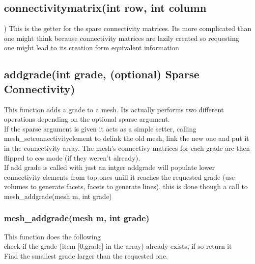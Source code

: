 \documentclass[]{article}
\begin{document}
\subsection{connectivitymatrix(int row, int column})
This is the getter for the spare connectivity matrices. Its more complicated than one might think because connectivity matrices are lazily created so requesting one might lead to its creation form equivalent information

\subsection{addgrade(int grade, (optional) Sparse Connectivity)}
This function adds a grade to a mesh. Its actually performs two different operations depending on the optional sparse argument.\\

If the sparse argument is given it acts as a simple setter, calling mesh\_setconnectivityelement to delink the old mesh, link the new one and put it in the connectivity array. The mesh's connectivy matrices for each grade are then flipped to ccs mode (if they weren't already).\\

If add grade is called with just an intger addgrade will populate lower connectivity elements from top ones unill it reaches the requested grade (use volumes to generate facets, facets to generate lines). this is done though a call to mesh\_addgrade(mesh m, int grade)

\subsubsection{mesh\_addgrade(mesh m, int grade)}
This function does the following\\

check if the grade (item [0,grade] in the array) already exists, if so return it\\

Find the smallest grade larger than the requested one.  
\end{document}
